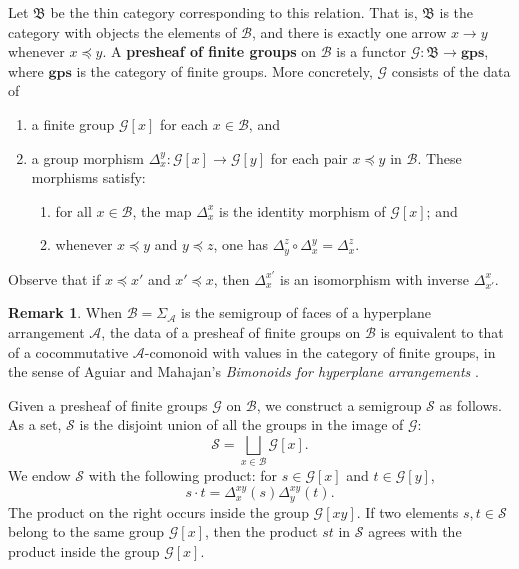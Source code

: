 \documentclass[11pt, oneside, reqno]{amsart}
\theoremstyle{definition}
\newtheorem{remark}[theorem]{Remark}
\numberwithin{equation}{section}
\newcommand{\defn}[1]{{\color{RoyalBlue}\bf#1}}
\def \A{{\mathcal{A}}}
\def \BB{{\mathcal{B}}}
\def \GG{{\mathcal{G}}}
\def \SS{{\mathcal{S}}}
\begin{document}
Let $\mathfrak{B}$ be the thin category corresponding to this relation.
That is, $\mathfrak{B}$ is the category with objects the elements of $\BB$, and
there is exactly one arrow $x \to y$ whenever $x \preceq y$.
A \defn{presheaf of finite groups} on $\BB$ is a functor $\GG : \mathfrak{B} \to
\mathbf{gps}$, where $\mathbf{gps}$ is the category of finite groups.
More concretely, $\GG$ consists of the data of
\begin{enumerate}
    \item a finite group $\GG[x]$ for each $x \in \BB$, and
    \item a group morphism $\Delta_x^y : \GG[x] \to \GG[y]$ for each pair $x \preceq y$ in $\BB$.
    These morphisms satisfy:
    \begin{enumerate}[label=(\roman*)]
        \item
            for all $x \in \BB$, the map $\Delta_x^x$ is the identity morphism of $\GG[x]$; and
        \item
            whenever $x \preceq y$ and $y \preceq z$, one has $\Delta_y^z \circ \Delta_x^y = \Delta_x^z$.
    \end{enumerate}
\end{enumerate}
Observe that if $x \preceq x'$ and $x' \preceq x$,
then $\Delta_x^{x'}$ is an isomorphism with inverse $\Delta_{x'}^x$.

\begin{remark}
    When $\BB = \Sigma_{\A}$ is the semigroup of faces of a hyperplane
    arrangement $\A$, the data of a presheaf of finite groups on $\BB$
    is equivalent to that of a cocommutative $\A$-comonoid with values
    in the category of finite groups, in the sense  of Aguiar and Mahajan's \emph{Bimonoids for hyperplane arrangements} \cite{am20}.
\end{remark}

Given a presheaf of finite groups $\GG$ on $\BB$, we construct a semigroup
$\SS$ as follows.
As a set, $\SS$ is the disjoint union of all the groups in the image of $\GG$:
\begin{equation}
    \label{presheaf-construction}
    \SS = \bigsqcup_{x \in \BB} \GG[x].
\end{equation}
We endow $\SS$ with the following product: for $s \in \GG[x]$ and $t \in \GG[y]$,
\begin{equation}\label{eq:sh-to-lrgb}
    s \cdot t = \Delta_x^{xy}(s)\Delta_y^{xy}(t).
\end{equation}
The product on the right occurs inside the group $\GG[xy]$.
If two elements $s,t \in \SS$ belong to the same group $\GG[x]$, then the product $st$ in $\SS$ agrees with the product inside the group $\GG[x]$.
\end{document}
